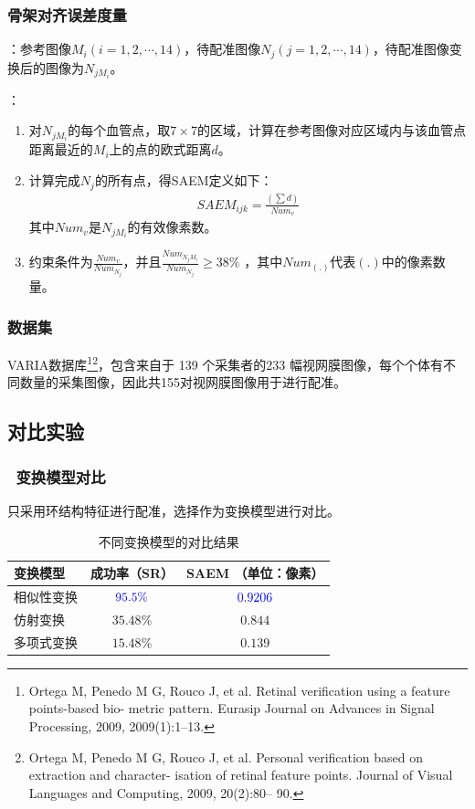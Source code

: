 \documentclass[notheorems,mathserif,table,compress]{beamer}  %
\begin{document}
\begin{frame}
\frametitle{骨架对齐误差度量}
{\color{blue}{预置条件}}：参考图像$M_i(i=1,2,\cdots,14)$，待配准图像$N_j(j=1,2,\cdots,14)$，待配准图像变换后的图像为$N_{jM_i}$。

{\color{blue}{算法步骤}}：
\begin{enumerate}
\item 对$N_{jM_i}$的每个血管点，取$7\times7$的区域，计算在参考图像对应区域内与该血管点距离最近的$M_i$上的点的欧式距离$d$。
\item 计算完成$N_j$的所有点，得SAEM定义如下：
\begin{align}
SAEM_{ijk}=\frac{(\sum d)}{Num_v}
\end{align}	 	
其中$Num_v$是$N_{jM_i}$的有效像素数。
\item 约束条件为$\frac{Num_v}{Num_{N_j}}$，并且$\frac{Num_{N_jM_i}}{Num_{N_j}}\geq 38\%$ ，其中$Num_{(.)}$代表$(.)$中的像素数量。
\end{enumerate}
\end{frame}

\begin{frame}
\frametitle{数据集}
VARIA数据库\footnote{Ortega M, Penedo M G, Rouco J, et al. Retinal verification using a feature points-based bio- metric pattern. Eurasip Journal on Advances in Signal Processing, 2009, 2009(1):1–13.}\footnote{Ortega M, Penedo M G, Rouco J, et al. Personal verification based on extraction and character- isation of retinal feature points. Journal of Visual Languages and Computing, 2009, 20(2):80– 90.}，包含来自于 139 个采集者的233 幅视网膜图像，每个个体有不同数量的采集图像，因此共155对视网膜图像用于进行配准。
\end{frame}

\subsection{对比实验}

\begin{frame}
\frametitle{~变换模型对比}
只采用环结构特征进行配准，选择{\color{blue}{相似性变换，仿射变换和二阶多项式变换}}作为变换模型进行对比。
\begin{table}[!h]
\caption{不同变换模型的对比结果}
\centering
\begin{tabular}{lcc}
\toprule
变换模型 & 成功率（SR）& SAEM （单位：像素）\\
\midrule
相似性变换 & ${\color{blue}{95.5\%}}$ & ${\color{blue}{0.9206}}$ \\
仿射变换 & $35.48\%$ & $0.844$              \\
多项式变换& $15.48\%$ & $0.139$\\
\bottomrule
\end{tabular}
\label{models}
\end{table}
\setlength{\fboxsep}{2pt}%
\end{frame}
\end{document}
